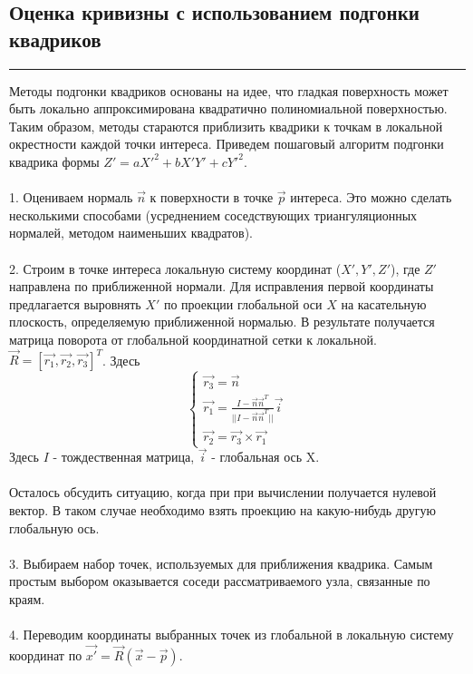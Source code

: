 \documentclass[12pt,a4paper, titlepage]{article}
\begin{document}
\subsection*{Оценка кривизны с использованием подгонки квадриков}
\noindent\rule{\textwidth}{1pt}
Методы подгонки квадриков основаны на идее, что гладкая поверхность может быть локально аппроксимирована квадратично полиномиальной поверхностью. Таким образом, методы стараются приблизить квадрики к точкам в локальной окрестности каждой точки интереса. Приведем пошаговый алгоритм подгонки квадрика формы $Z' = a X'^2 + b X' Y' + c Y'^2$.
\\
\\
1. Оцениваем нормаль $\vec{n}$ к поверхности в точке $\vec{p}$ интереса. Это можно сделать несколькими способами (усреднением соседствующих триангуляционных нормалей, методом наименьших квадратов).
\\
\\
2. Строим в точке интереса локальную систему координат ($X', Y', Z'$), где $Z'$ направлена по приближенной нормали. Для исправления первой координаты предлагается выровнять $X'$ по проекции глобальной оси $X$ на касательную плоскость, определяемую приближенной нормалью. В результате получается матрица поворота от глобальной координатной сетки к локальной. $\vec{R} = [\vec{r_1}, \vec{r_2}, \vec{r_3}]^{T}$. Здесь 
\begin{equation}
\begin{cases}
\vec{r_3} = \vec{n}
\\
\vec{r_1} = \frac{I - \vec{n}\vec{n}^T}{||I - \vec{n}\vec{n}^T||} \vec{i}
\\
\vec{r_2} = \vec{r_3} \times \vec{r_1}
\end{cases}
\end{equation}
Здесь $I$ - тождественная матрица, $\vec{i}$ - глобальная ось X.
\\
\\
Осталось обсудить ситуацию, когда при при вычислении получается нулевой вектор. В таком случае необходимо взять проекцию на какую-нибудь другую глобальную ось.
\\
\\
3. Выбираем набор точек, используемых для приближения квадрика. Самым простым выбором оказывается соседи рассматриваемого узла, связанные по краям.
\\
\\
4. Переводим координаты выбранных точек из глобальной в локальную систему координат по $\vec{x'} = \vec{R}(\vec{x} - \vec{p})$.
\\
\end{document}
